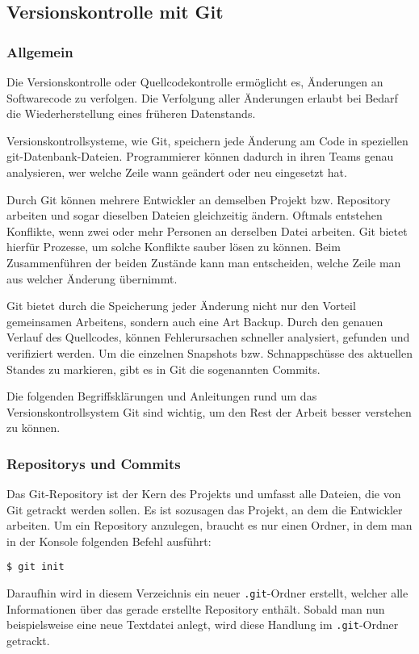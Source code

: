 \subsection{Versionskontrolle mit Git}
\subsubsection{Allgemein}
Die Versionskontrolle oder Quellcodekontrolle ermöglicht es, Änderungen an
Softwarecode zu verfolgen. Die Verfolgung aller Änderungen erlaubt bei Bedarf
die Wiederherstellung eines früheren Datenstands. \parencite{git-allgemein}

Versionskontrollsysteme, wie Git, speichern jede Änderung am Code in speziellen
git-Datenbank-Dateien. Programmierer können dadurch in ihren Teams genau
analysieren, wer welche Zeile wann geändert oder neu eingesetzt hat.

Durch Git können mehrere Entwickler an demselben Projekt bzw. Repository
arbeiten und sogar dieselben Dateien gleichzeitig ändern. Oftmals entstehen
Konflikte, wenn zwei oder mehr Personen an derselben Datei arbeiten. Git bietet
hierfür Prozesse, um solche Konflikte sauber lösen zu können. Beim
Zusammenführen der beiden Zustände kann man entscheiden, welche Zeile man aus
welcher Änderung übernimmt.

Git bietet durch die Speicherung jeder Änderung nicht nur den Vorteil
gemeinsamen Arbeitens, sondern auch eine Art \glqq Backup\grqq{}. Durch den
genauen Verlauf des Quellcodes, können Fehlerursachen schneller analysiert,
gefunden und verifiziert werden. Um die einzelnen Snapshots bzw. Schnappschüsse
des aktuellen Standes zu markieren, gibt es in Git die sogenannten Commits.

\newpage

Die folgenden Begriffsklärungen und Anleitungen rund um das
Versionskontrollsystem Git sind wichtig, um den Rest der Arbeit besser verstehen
zu können.

\subsubsection{Repositorys und Commits}
Das Git-Repository ist der Kern des Projekts und umfasst alle Dateien, die von
Git getrackt werden sollen. Es ist sozusagen das Projekt, an dem die Entwickler
arbeiten. Um ein Repository anzulegen, braucht es nur einen Ordner, in dem man
in der Konsole folgenden Befehl ausführt:
\begin{lstlisting}[style=Bash]
    $ git init
\end{lstlisting}
Daraufhin wird in diesem Verzeichnis ein neuer \texttt{.git}-Ordner erstellt,
welcher alle Informationen über das gerade erstellte Repository enthält. Sobald
man nun beispielsweise eine neue Textdatei anlegt, wird diese Handlung im
\texttt{.git}-Ordner getrackt.

